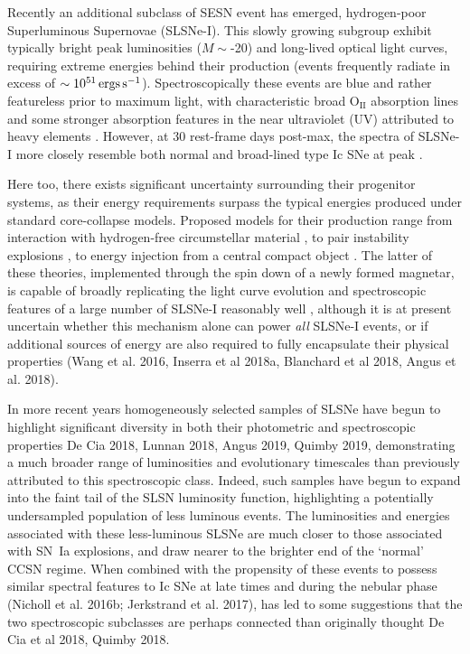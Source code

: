 \documentclass[a4paper,fleqn,usenatbib]{mnras}
\newcommand{\angus}[1]{\color{JungleGreen}#1\color{black}}
\begin{document}
Recently an additional subclass of SESN event has emerged, hydrogen-poor Superluminous Supernovae (SLSNe-I). This slowly growing subgroup exhibit typically bright peak luminosities ($M\sim$-20) and long-lived optical light curves, requiring extreme energies behind their production (events frequently radiate in excess of $\sim10^{51}\,{\rm ergs\,s^{-1}}$). Spectroscopically these events are blue
and rather featureless prior to maximum light, with characteristic broad O$_{\mathrm{II}}$ absorption lines {\angus{{Quimby et al. 2011}}} and some stronger absorption features in the near ultraviolet (UV) attributed to heavy elements {\angus{{(see more detailed discussion in Quimby et al. 2018)}}}. However, at 30 rest-frame days post-max, the spectra of SLSNe-I more closely resemble both normal and broad-lined type Ic SNe at peak {\angus{{(Pastorello et al. 2010; Liu et al. 2017)}}}.

Here too, there exists significant uncertainty surrounding their progenitor systems, as their energy requirements surpass the typical energies produced under standard core-collapse models. Proposed models for their production range from interaction with hydrogen-free circumstellar material \citep{Chevalier2011,Chatzopoulos2013,Sorokina2016}, to pair instability explosions \citep{Woosley2007,Yan2015}, to energy injection from a central compact object \citep{Kasen2010,Woosley2010,Inserra2013}. The latter of these theories, implemented through the spin down of a newly formed magnetar, is capable of broadly replicating the light curve evolution and spectroscopic features of a large number of SLSNe-I reasonably well \citep{Dessart2012,Inserra2013,Nicholl2013,Mazzali2016,Nicholl2017B}, although it is at present uncertain whether this mechanism alone can power {\textit{all}} SLSNe-I events, or if additional sources of energy are also required to fully encapsulate their physical properties \angus{(Wang et al. 2016, Inserra et al 2018a, Blanchard et al 2018, Angus et al. 2018)}.

In more recent years homogeneously selected samples of SLSNe have begun to highlight significant diversity in both their photometric and spectroscopic properties \angus{De Cia 2018, Lunnan 2018, Angus 2019, Quimby 2019}, demonstrating a much broader range of luminosities and evolutionary timescales than previously attributed to this spectroscopic class. Indeed, such samples have begun to expand into the faint tail of the SLSN luminosity function, highlighting a potentially undersampled population of less luminous events. The luminosities and energies associated with these less-luminous SLSNe are much closer to those associated with SN~Ia explosions, and draw nearer to the brighter end of the \lq normal\rq~ CCSN regime. When combined with the propensity of these events to possess similar spectral features to Ic SNe at late times and during the nebular phase {\angus{(Nicholl et al. 2016b; Jerkstrand et al. 2017)}}, has led to some suggestions that the two spectroscopic subclasses are perhaps connected than originally thought \angus{De Cia et al 2018, Quimby 2018}.
\end{document}
